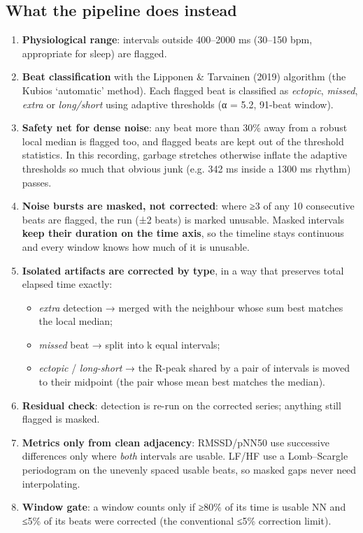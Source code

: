 \documentclass[11pt,a4paper]{article}
\begin{document}
\subsection{What the pipeline does instead}\label{sec:what-the-pipeline-does-instead}
\begin{enumerate}
\item \textbf{Physiological range}: intervals outside 400–2000 ms (30–150 bpm, appropriate for sleep) are flagged.
\item \textbf{Beat classification} with the Lipponen \& Tarvainen (2019) algorithm (the Kubios `automatic' method). Each flagged beat is classified as \emph{ectopic}, \emph{missed}, \emph{extra} or \emph{long/short} using adaptive thresholds (α = 5.2, 91-beat window).
\item \textbf{Safety net for dense noise}: any beat more than 30\% away from a robust local median is flagged too, and flagged beats are kept out of the threshold statistics. In this recording, garbage stretches otherwise inflate the adaptive thresholds so much that obvious junk (e.g. 342 ms inside a 1300 ms rhythm) passes.
\item \textbf{Noise bursts are masked, not corrected}: where ≥3 of any 10 consecutive beats are flagged, the run (±2 beats) is marked unusable. Masked intervals \textbf{keep their duration on the time axis}, so the timeline stays continuous and every window knows how much of it is unusable.
\item \textbf{Isolated artifacts are corrected by type}, in a way that preserves total elapsed time exactly:
\begin{itemize}
\item \emph{extra} detection → merged with the neighbour whose sum best matches the local median;
\item \emph{missed} beat → split into k equal intervals;
\item \emph{ectopic} / \emph{long-short} → the R-peak shared by a pair of intervals is moved to their midpoint (the pair whose mean best matches the median).
\end{itemize}
\item \textbf{Residual check}: detection is re-run on the corrected series; anything still flagged is masked.
\item \textbf{Metrics only from clean adjacency}: RMSSD/pNN50 use successive differences only where \emph{both} intervals are usable. LF/HF use a Lomb–Scargle periodogram on the unevenly spaced usable beats, so masked gaps never need interpolating.
\item \textbf{Window gate}: a window counts only if ≥80\% of its time is usable NN and ≤5\% of its beats were corrected (the conventional ≤5\% correction limit).
\end{enumerate}
\end{document}
